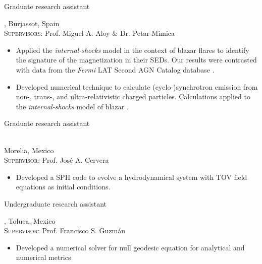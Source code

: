 %
{\DAAval}{Graduate research assistant}{}{}%
{\UVval, Burjassot, Spain\\
  \textsc{Supervisors}: Prof. Miguel A. Aloy \& Dr. Petar Mimica%
  \begin{itemize}
    \item Applied the \emph{internal-shocks} model in the context of blazar flares to identify the signature of the magnetization in their SEDs. Our results were contrasted with data from the \emph{Fermi} LAT Second AGN Catalog database \cite{RuedaBecerril:2014mi}.
    \item Developed numerical technique to calculate (cyclo-)synchrotron emission from non-, trans-, and ultra-relativistic charged particles. Calculations applied to the \emph{internal-shocks} model of blazar \cite{RuedaBecerril:2017mi}.
  \end{itemize}
}
%
{\IFMes}{Graduate research assistant}{}{}%
{\UMSNHes\\
  Morelia, Mexico\\
  \textsc{Supervisor}: Prof. José A. Cervera%
  \begin{itemize}
    \item Developed a SPH code to evolve a hydrodynamical system with TOV field equations as initial conditions.
  \end{itemize}
}
%
{\FCes}{Undergraduate research assistant}{}{}%
{\UAEMes, Toluca, Mexico\\
  \textsc{Supervisor}: Prof. Francisco S. Guzmán%
  \begin{itemize}
    \item Developed a numerical solver for null geodesic equation for analytical and numerical metrics \cite{Guzman:2009ru}
  \end{itemize}
}



